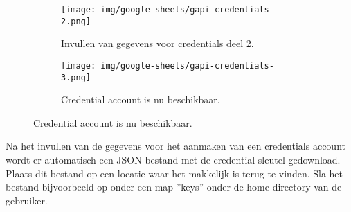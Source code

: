 \begin{figure}[h]\ContinuedFloat
    \begin{subfigure}{0.5\textwidth}
        \captionsetup{width=0.8\linewidth}
        \texttt{[image: img/google-sheets/gapi-credentials-2.png]}
        \centering
        \caption{Invullen van gegevens voor credentials deel 2.}
    \end{subfigure}
    \begin{subfigure}{0.5\textwidth}
        \captionsetup{width=0.8\linewidth}
        \texttt{[image: img/google-sheets/gapi-credentials-3.png]}
        \centering
        \caption{Credential account is nu beschikbaar.}
    \end{subfigure}
\end{figure}

Na het invullen van de gegevens voor het aanmaken van een credentials account wordt er automatisch een JSON bestand met de credential sleutel gedownload. Plaats dit bestand op een locatie waar het makkelijk is terug te vinden. Sla het bestand bijvoorbeeld op onder een map ''keys'' onder de home directory van de gebruiker.